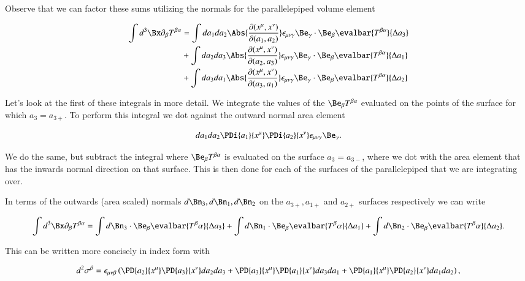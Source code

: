 Observe that we can factor these sums utilizing the normals for the parallelepiped volume element

\begin{align*}
\int d^3 \Bx \partial_\beta T^{\beta \alpha}
&=
\int da_1 da_2 
\Abs{ \frac{\partial(x^\mu, x^\nu)}{\partial (a_1, a_2)}} \epsilon_{\mu \nu \gamma} \Be_\gamma \cdot \Be_\beta
\evalbar{T^{\beta \alpha}}{\Delta a_3} \\
&+
\int da_2 da_3 
\Abs{ \frac{\partial(x^\mu, x^\nu)}{\partial (a_2, a_3)}} \epsilon_{\mu \nu \gamma} \Be_\gamma \cdot \Be_\beta
\evalbar{T^{\beta \alpha}}{\Delta a_1} \\
&+
\int da_3 da_1 
\Abs{ \frac{\partial(x^\mu, x^\nu)}{\partial (a_3, a_1)}} \epsilon_{\mu \nu \gamma} \Be_\gamma \cdot \Be_\beta
\evalbar{T^{\beta \alpha}}{\Delta a_2}
\end{align*}

Let's look at the first of these integrals in more detail.  We integrate the values of the $\Be_\beta T^{\beta \alpha}$ evaluated on the points of the surface for which $a_3 = a_{3+}$.  To perform this integral we dot against the outward normal area element

\begin{equation}\label{eqn:relativisticElectrodynamicsPS6:539}
da_1 da_2 \PDi{a_1}{x^\mu} \PDi{a_2}{x^\nu} \epsilon_{\mu\nu\gamma} \Be_\gamma.
\end{equation}

  We do the same, but subtract the integral where $\Be_\beta T^{\beta\alpha}$ is evaluated on the surface $a_3 = a_{3-}$, where we dot with the area element that has the inwards normal direction on that surface.  This is then done for each of the surfaces of the parallelepiped that we are integrating over.

In terms of the outwards (area scaled) normals $d\Bn_3, d\Bn_1, d\Bn_2$ on the $a_{3+}, a_{1+}$ and $a_{2+}$ surfaces respectively we can write

\begin{equation}\label{eqn:relativisticElectrodynamicsPS6:540}
\int d^3 \Bx \partial_\beta T^{\beta \alpha} = 
\int d\Bn_3 \cdot \Be_\beta \evalbar{T^{\beta}{\alpha}}{\Delta a_3}
+\int d\Bn_1 \cdot \Be_\beta \evalbar{T^{\beta}{\alpha}}{\Delta a_1}
+\int d\Bn_2 \cdot \Be_\beta \evalbar{T^{\beta}{\alpha}}{\Delta a_2}.
\end{equation}

This can be written more concisely in index form with

\begin{equation}\label{eqn:relativisticElectrodynamicsPS6:640}
d^2 \sigma^\beta = 
\epsilon_{\mu\nu\beta} \left(
\PD{a_2}{x^\mu}
\PD{a_3}{x^\nu} da_2 da_3
+\PD{a_3}{x^\mu}
\PD{a_1}{x^\nu} da_3 da_1
+\PD{a_1}{x^\mu}
\PD{a_2}{x^\nu} da_1 da_2
\right),
\end{equation}

